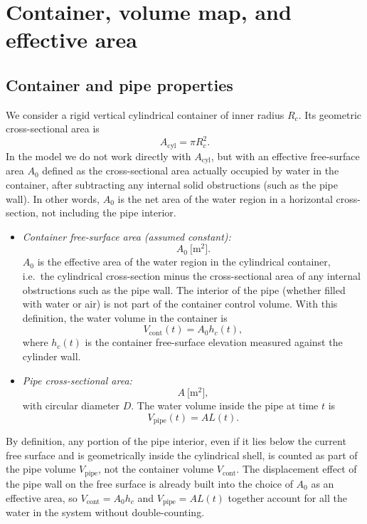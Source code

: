 \documentclass[11pt]{article}
\begin{document}
\section{Container, volume map, and effective area}
\label{sec:container}

\subsection{Container and pipe properties}

We consider a rigid vertical cylindrical container of inner radius $R_c$. Its geometric
cross-sectional area is
\[
  A_{\text{cyl}} = \pi R_c^2.
\]
In the model we do not work directly with $A_{\text{cyl}}$, but with an effective free-surface
area $A_0$ defined as the cross-sectional area actually occupied by water in the container,
after subtracting any internal solid obstructions (such as the pipe wall). In other words,
$A_0$ is the net area of the water region in a horizontal cross-section, not including the
pipe interior.

\begin{itemize}
  \item \emph{Container free-surface area (assumed constant):}
  \[
    A_0\ \text{[m$^2$]}.
  \]
  $A_0$ is the effective area of the water region in the cylindrical container, i.e.\ the
  cylindrical cross-section minus the cross-sectional area of any internal obstructions such
  as the pipe wall. The interior of the pipe (whether filled with water or air) is not part of
  the container control volume. With this definition, the water volume in the container is
  \[
    V_{\text{cont}}(t) = A_0 h_c(t),
  \]
  where $h_c(t)$ is the container free-surface elevation measured against the cylinder wall.
  \item \emph{Pipe cross-sectional area:}
  \[
    A\ \text{[m$^2$]},
  \]
  with circular diameter $D$. The water volume inside the pipe at time $t$ is
  \[
    V_{\text{pipe}}(t) = A L(t).
  \]
\end{itemize}

By definition, any portion of the pipe interior, even if it lies below the current free surface
and is geometrically inside the cylindrical shell, is counted as part of the pipe volume
$V_{\text{pipe}}$, not the container volume $V_{\text{cont}}$. The displacement effect of the
pipe wall on the free surface is already built into the choice of $A_0$ as an effective area,
so $V_{\text{cont}} = A_0 h_c$ and $V_{\text{pipe}} = A L(t)$ together account for all the
water in the system without double-counting.
\end{document}
